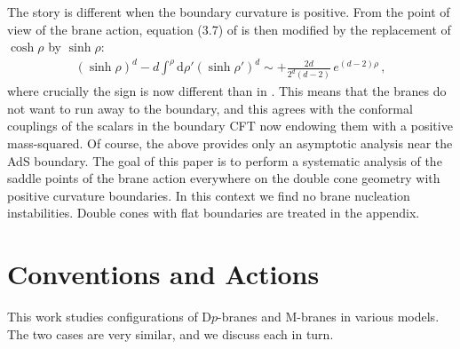 \documentclass[11pt]{article}
\renewcommand{\d}{\mathrm{d}}
\begin{document}
The story is different when the boundary curvature is positive.
From the point of view of the brane action, equation (3.7) of \cite{MaldacenaMaoz} is then modified by the replacement of $\cosh \rho$ by $\sinh \rho$:
\begin{align}
    (\sinh \rho)^d - d \int^\rho \d \rho' (\sinh \rho')^d \sim + \frac{2d}{2^d(d-2)} \,
    e^{(d-2)\rho} \, ,
\end{align}
where crucially the sign is now different than in \cite{MaldacenaMaoz}.
This means that the branes do not want to run away to the boundary, and this agrees with the conformal couplings of the scalars in the boundary CFT now endowing them with a positive mass-squared.
Of course, the above provides only an asymptotic analysis near the AdS boundary.
The goal of this paper is to perform a systematic analysis of the saddle points of the brane action everywhere on the double cone geometry with positive curvature boundaries.
In this context we find no brane nucleation instabilities.
Double cones with flat boundaries are treated in the appendix.




\section{Conventions and Actions \label{sec:coven}}

This work studies configurations of D$p$-branes and M-branes in various models. 
The two cases are very similar, and we discuss each in turn.
\end{document}
